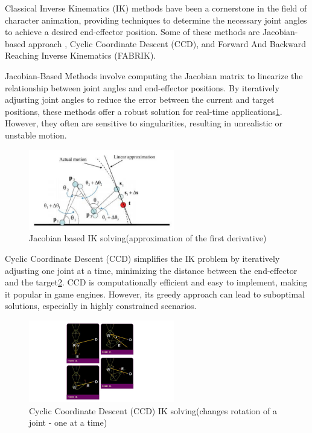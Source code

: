 \documentclass[../../main.tex]{subfiles}
\begin{document}
Classical Inverse Kinematics (IK) methods have been a cornerstone in the field of character animation, providing techniques to determine the necessary joint angles to achieve a desired end-effector position. Some of these methods are Jacobian-based approach \cite{4648032}, Cyclic Coordinate Descent (CCD)\cite{kenwright2012inverse}, and Forward And Backward Reaching Inverse Kinematics (FABRIK)\cite{aristidou2011fabrik}.

Jacobian-Based Methods involve computing the Jacobian matrix to linearize the relationship between joint angles and end-effector positions. By iteratively adjusting joint angles to reduce the error between the current and target positions, these methods offer a robust solution for real-time applications\ref{fig:jacobian_based}. However, they often are sensitive to singularities, resulting in unrealistic or unstable motion.

\begin{figure}
    \centering \includegraphics[width = 2.5in]{chapters/motion_matching/images/jacobian_based.png}
    \caption{Jacobian based IK solving(approximation of the first derivative)}
    \label{fig:jacobian_based}
\end{figure}

Cyclic Coordinate Descent (CCD) simplifies the IK problem by iteratively adjusting one joint at a time, minimizing the distance between the end-effector and the target\ref{fig:ccdik}. CCD is computationally efficient and easy to implement, making it popular in game engines. However, its greedy approach can lead to suboptimal solutions, especially in highly constrained scenarios.

\begin{figure}
  \centering \includegraphics[width = 2.5in]{chapters/motion_matching/images/ccdik.png}
  \caption{Cyclic Coordinate Descent (CCD) IK solving(changes rotation of a joint - one at a time)}
  \label{fig:ccdik}
\end{figure}
\end{document}
